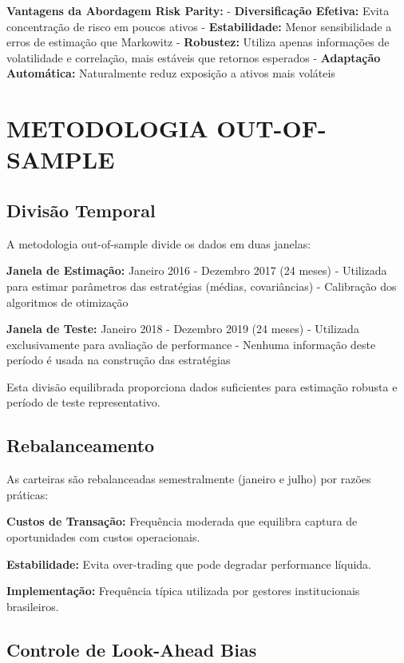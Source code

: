 \textbf{Vantagens da Abordagem Risk Parity:}
- \textbf{Diversificação Efetiva:} Evita concentração de risco em poucos ativos
- \textbf{Estabilidade:} Menor sensibilidade a erros de estimação que Markowitz
- \textbf{Robustez:} Utiliza apenas informações de volatilidade e correlação, mais estáveis que retornos esperados
- \textbf{Adaptação Automática:} Naturalmente reduz exposição a ativos mais voláteis

\section{METODOLOGIA OUT-OF-SAMPLE}

\subsection{Divisão Temporal}

A metodologia out-of-sample divide os dados em duas janelas:

\textbf{Janela de Estimação:} Janeiro 2016 - Dezembro 2017 (24 meses)
- Utilizada para estimar parâmetros das estratégias (médias, covariâncias)
- Calibração dos algoritmos de otimização

\textbf{Janela de Teste:} Janeiro 2018 - Dezembro 2019 (24 meses)  
- Utilizada exclusivamente para avaliação de performance
- Nenhuma informação deste período é usada na construção das estratégias

Esta divisão equilibrada proporciona dados suficientes para estimação robusta e período de teste representativo.

\subsection{Rebalanceamento}

As carteiras são rebalanceadas semestralmente (janeiro e julho) por razões práticas:

\textbf{Custos de Transação:} Frequência moderada que equilibra captura de oportunidades com custos operacionais.

\textbf{Estabilidade:} Evita over-trading que pode degradar performance líquida.

\textbf{Implementação:} Frequência típica utilizada por gestores institucionais brasileiros.

\subsection{Controle de Look-Ahead Bias}

